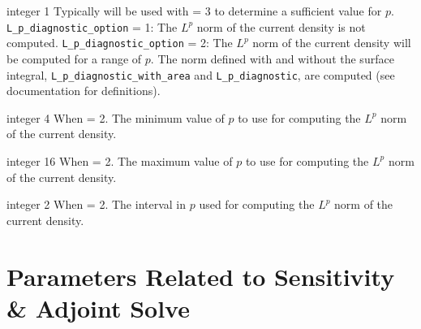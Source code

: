 \myhrule

{integer}
{1}
{Typically will be used with  = 3 to determine a sufficient value for $p$.}
{
\texttt{L\_p\_diagnostic\_option} = 1: The $L^p$ norm of the current density is not computed. 
\texttt{L\_p\_diagnostic\_option} = 2: The $L^p$ norm of the current density will be computed
for a range of $p$. The norm defined with and without the surface integral, \texttt{L\_p\_diagnostic\_with\_area} and \texttt{L\_p\_diagnostic}, are computed (see  documentation for definitions).
}

\myhrule

{integer}
{4}
{When  = 2.}
{
The minimum value of $p$ to use for computing the $L^p$ norm of the current density.
}

\myhrule

{integer}
{16}
{When  = 2.}
{
The maximum value of $p$ to use for computing the $L^p$ norm of the current density.
}

\myhrule

{integer}
{2}
{When  = 2.}
{
The interval in $p$ used for computing the $L^p$ norm of the current density. 
}

\myhrule

\section{Parameters Related to Sensitivity \& Adjoint Solve}

\myhrule

